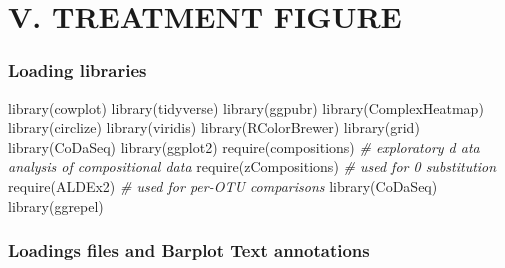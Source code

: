 \documentclass[]{interact}
\theoremstyle{plain}%
\theoremstyle{definition}
\theoremstyle{remark}
\newenvironment{Shaded}{\begin{snugshade}}{\end{snugshade}}
\newcommand{\CommentTok}[1]{\textcolor[rgb]{0.56,0.35,0.01}{\textit{#1}}}
\newcommand{\FunctionTok}[1]{\textcolor[rgb]{0.00,0.00,0.00}{#1}}
\newcommand{\NormalTok}[1]{#1}
\begin{document}
\hypertarget{v.-treatment-figure}{%
\section{V. TREATMENT FIGURE}\label{v.-treatment-figure}}

\hypertarget{loading-libraries-3}{%
\subsubsection{Loading libraries}\label{loading-libraries-3}}

\begin{Shaded}
\begin{Highlighting}[]
\FunctionTok{library}\NormalTok{(cowplot)}
\FunctionTok{library}\NormalTok{(tidyverse)}
\FunctionTok{library}\NormalTok{(ggpubr)}
\FunctionTok{library}\NormalTok{(ComplexHeatmap)}
\FunctionTok{library}\NormalTok{(circlize)}
\FunctionTok{library}\NormalTok{(viridis)}
\FunctionTok{library}\NormalTok{(RColorBrewer)}
\FunctionTok{library}\NormalTok{(grid)}
\FunctionTok{library}\NormalTok{(CoDaSeq)}
\FunctionTok{library}\NormalTok{(ggplot2)}
\FunctionTok{require}\NormalTok{(compositions) }\CommentTok{\# exploratory d ata analysis of compositional data}
\FunctionTok{require}\NormalTok{(zCompositions) }\CommentTok{\# used for 0 substitution}
\FunctionTok{require}\NormalTok{(ALDEx2) }\CommentTok{\# used for per{-}OTU comparisons}
\FunctionTok{library}\NormalTok{(CoDaSeq)}
\FunctionTok{library}\NormalTok{(ggrepel)}
\end{Highlighting}
\end{Shaded}

\hypertarget{loadings-files-and-barplot-text-annotations-1}{%
\subsubsection{Loadings files and Barplot Text
annotations}\label{loadings-files-and-barplot-text-annotations-1}}
\end{document}
